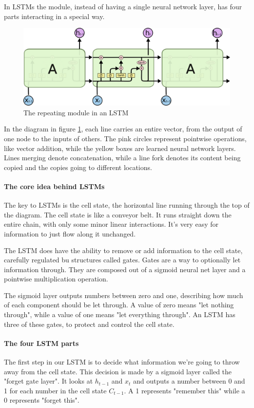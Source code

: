 \documentclass{article}
\begin{document}
In LSTMs the module, instead of having a single neural network layer, has four parts interacting in a special way.

\begin{figure}[htbp]
  \centering
  \includegraphics[width=0.8\linewidth]{img/lstm_chain.png}
  \caption{The repeating module in an LSTM}
  \label{fig:lstm_chain}
\end{figure}

In the diagram in figure \ref{fig:lstm_chain}, each line carries an entire vector, from the output of one node to the inputs of others.
The pink circles represent pointwise operations, like vector addition, while the yellow boxes are learned neural network layers.
Lines merging denote concatenation, while a line fork denotes its content being copied and the copies going to different locations.

\paragraph{The core idea behind LSTMs}

The key to LSTMs is the cell state, the horizontal line running through the top of the diagram.
The cell state is like a conveyor belt. It runs straight down the entire chain, with only some minor linear interactions.
It's very easy for information to just flow along it unchanged.

The LSTM does have the ability to remove or add information to the cell state, carefully regulated bu structures called gates.
Gates are a way to optionally let information through.
They are composed out of a sigmoid neural net layer and a pointwise multiplication operation.

The sigmoid layer outputs numbers between zero and one, describing how much of each component should be let through. A value of zero means "let nothing through", while a value of one means "let everything through".
An LSTM has three of these gates, to protect and control the cell state.

\paragraph{The four LSTM parts}
The first step in our LSTM is to decide what information we're going to throw away from the cell state.
This decision is made by a sigmoid layer called the "forget gate layer".
It looks at $h_{t-1}$ and $x_t$ and outputs a number between 0 and 1 for each number in the cell state $C_{t-1}$.
A 1 represents "remember this" while a 0 represents "forget this".
\end{document}
